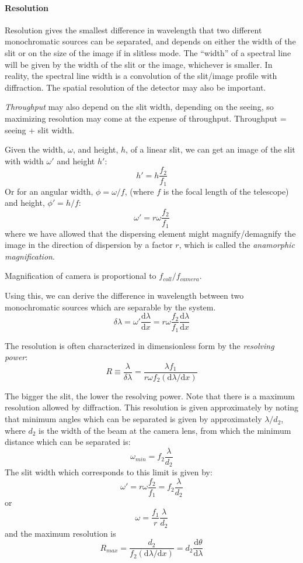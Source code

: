 \documentclass[12pt]{article}
\newcommand{\mynotes}[1]{\textcolor{myBlue}{#1}}
\begin{document}
\paragraph{Resolution}
Resolution gives the smallest difference in wavelength that two different
monochromatic sources can be separated, and depends on either the width of the
slit or on the size of the image if in slitless mode. The ``width'' of a
spectral line will be given by the width of the slit or the image, whichever is
smaller. In reality, the spectral line width is a convolution of the slit/image
profile with diffraction. The spatial resolution of the detector may also be
important.

\textit{Throughput} may also depend on the slit width, depending on
the seeing, so maximizing resolution may come at the expense of
throughput. \mynotes{Throughput = seeing + slit width.}

Given the width, $\omega$, and height, $h$, of a linear slit, we can get an
image of the slit with width $\omega'$ and height $h'$:
\[
    h' = h\frac{f_{2}}{f_{1}}
    \]
Or for an angular width, $\phi = \omega/f$,
(where $f$ is the focal length of the telescope) and height,
$\phi' = h/f$:
\[
\omega' = r\omega\frac{f_{2}}{f_{1}}
    \]
where we have allowed that the dispersing element might magnify/demagnify the
image in the direction of dispersion by a factor $r$, which is called the
\textit{anamorphic magnification}.

\mynotes{Magnification of camera is proportional to $f_{coll}/f_{camera}$.}

Using this, we can derive the difference in wavelength between two
monochromatic sources which are separable by the system.
\[
    \delta\lambda
    = \omega'\frac{\textrm{d}\lambda}{\textrm{d}x}
    = r\omega\frac{f_{2}}{f_{1}}\frac{\textrm{d}\lambda}{\textrm{d}x}
    \]

The resolution is often characterized in dimensionless form by
the \textit{resolving power}:
\[
    R \equiv \frac{\lambda}{\delta\lambda}
    = \frac{\lambda{f_{1}}}{r\omega{f_{2}}\left(
    \mathrm{d}\lambda/\textrm{d}x\right)}
    \]

The bigger the slit, the lower the resolving power.
Note that there is a maximum resolution allowed by diffraction. This resolution
is given approximately by noting that minimum angles which can be separated is
given by approximately $\lambda/d_{2}$, where $d_{2}$ is the width of the beam
at the camera lens, from which the minimum distance which can be separated is:
\[
    \omega_{min} = f_{2}\frac{\lambda}{d_{2}}
    \]
The slit width which corresponds to this limit is given by:
\[
    \omega' = r\omega\frac{f_{2}}{f_{1}} = f_{2}\frac{\lambda}{d_{2}}
    \]
or
\[
    \omega = \frac{f_{1}}{r}\frac{\lambda}{d_{2}}
    \]
and the maximum resolution is
\[
    R_{max} =
    \frac{d_{2}}{f_{2}\left(\mathrm{d}\lambda/\mathrm{d}x\right)} =
    d_{2}\frac{\mathrm{d}\theta}{\mathrm{d}\lambda}
    \]
\end{document}
